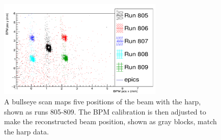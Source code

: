 \begin{figure}
\begin{center}
	\includegraphics[width=0.7\textwidth]{./setup/fig/bullseye_scan.png}
	\caption{A bullseye scan maps five positions of the beam with the harp, shown as runs 805-809. The BPM calibration is then adjusted to make the reconstructed beam position, shown as gray blocks, match the harp data.}
	\label{fig:bullseye}
\end{center}
\end{figure}